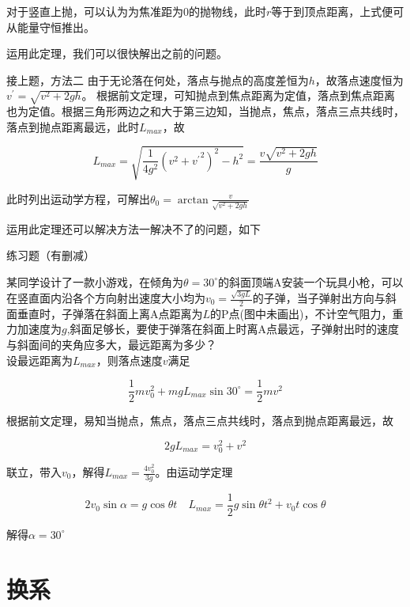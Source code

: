 对于竖直上抛，可以认为为焦准距为$0$的抛物线，此时$r$等于到顶点距离，上式便可从能量守恒推出。

运用此定理，我们可以很快解出之前的问题。

\begin{ep}{接上题，方法二}{}
由于无论落在何处，落点与抛点的高度差恒为$h$，故落点速度恒为$v^{\prime} = \sqrt{v^2 + 2gh}$。
根据前文定理，可知抛点到焦点距离为定值，落点到焦点距离也为定值。根据三角形两边之和大于第三边知，当抛点，焦点，落点三点共线时，落点到抛点距离最远，此时$L_{max}$，故

$$L_{max} = \sqrt{\frac{1}{4g^2} (v^2 + {v^{\prime}}^2)^2 - h^2} = \frac{v\sqrt{v^2 + 2gh}}{g}$$

此时列出运动学方程，可解出$\theta_0 = \arctan{\frac{v}{\sqrt{v^2 + 2gh}}}$
\end{ep}

运用此定理还可以解决方法一解决不了的问题，如下

\begin{ep}{练习题（有删减）}{}



某同学设计了一款小游戏，在倾角为$\theta = 30^{\circ}$的斜面顶端A安装一个玩具小枪，可以在竖直面内沿各个方向射出速度大小均为$v_0 = \frac{\sqrt{3gL}}{2}$的子弹，当子弹射出方向与斜面垂直时，子弹落在斜面上离A点距离为$L$的P点(图中未画出)，不计空气阻力，重力加速度为$g$,斜面足够长，要使于弹落在斜面上时离A点最远，子弹射出时的速度与斜面间的夹角应多大，最远距离为多少？
~\\

设最远距离为$L_{max}$，则落点速度$v$满足

$$\frac{1}{2} m v_0^2 + mgL_{max} \sin 30^{\circ} = \frac{1}{2} m v^2$$

根据前文定理，易知当抛点，焦点，落点三点共线时，落点到抛点距离最远，故

$$2gL_{max} = v_0^2 + v^2$$

联立，带入$v_0$，解得$L_{max} = \frac{4 v_0^2}{3g}$。由运动学定理

$$2 v_0 \sin \alpha = g \cos \theta t \quad L_{max} = \frac{1}{2} g \sin \theta t^2 + v_0 t \cos \theta$$

解得$\alpha = 30^{\circ}$

\end{ep}

\section{换系}

